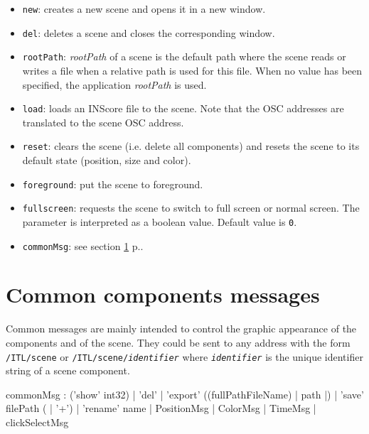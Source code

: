 \documentclass[a4paper,twoside]{report}
\newcommand{\toplevel}[1]	{\chapter{#1}}
\newcommand{\fullref}[1]	{\ref{#1} p.\pageref{#1}}
\newcommand{\OSC}[1]		{\texttt{#1}}
\newcommand{\values}[1]	{\texttt{#1}}
\begin{document}
\begin{itemize}
\item \OSC{new}: creates a new scene and opens it in a new window.
\item \OSC{del}: deletes a scene and closes the corresponding window.
\item \OSC{rootPath}: \emph{rootPath} of a scene is the default path where the scene reads or writes a file when a relative path is used for this file. When no value has been specified, the application  \emph{rootPath} is used.
\item \OSC{load}: loads an INScore file to the scene. Note that the OSC addresses are translated to the scene OSC address.
\item \OSC{reset}: clears the scene (i.e. delete all components) and resets the scene to its default state (position, size and color).
\item \OSC{foreground}: put the scene to foreground.
\item \OSC{fullscreen}: requests the scene to switch to full screen or normal screen.  The parameter is interpreted as a boolean value. Default value is \values{0}.
\item \OSC{commonMsg}: see section \fullref{common}.
\end{itemize}


\toplevel{Common components messages}
\label{common}
Common messages are mainly intended to control the graphic appearance of the components and  of the scene.
They could be sent to any address with the form \OSC{/ITL/scene} or \OSC{/ITL/scene/\textit{identifier}} where \OSC{\textit{identifier}} is the unique identifier string of a scene component.
\begin{rail}
commonMsg :  ('show' int32)
			| 'del'
			| 'export' ((fullPathFileName) | path |)
			| 'save' filePath ( | '+')
			| 'rename' name
			| PositionMsg
			| ColorMsg
			| TimeMsg
			| clickSelectMsg
\end{rail}
\end{document}
